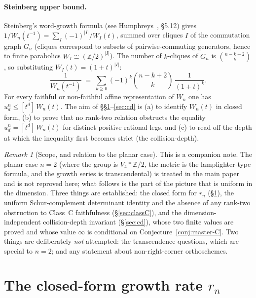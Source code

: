 \documentclass[11pt,a4paper]{article}
\theoremstyle{remark}
\newtheorem{remark}[theorem]{Remark}
\theoremstyle{plain}
\begin{document}
\paragraph{Steinberg upper bound.}  Steinberg's word-growth formula
(see Humphreys~\cite{humphreys90}, §5.12) gives
$1 / W_n(t^{-1}) = \sum_I (-1)^{|I|} / W_I(t)$, summed over cliques
$I$ of the commutation graph $G_n$ (cliques correspond to subsets
of pairwise-commuting generators, hence to finite parabolics
$W_I \cong (\mathbb{Z}/2)^{|I|}$).  The number of $k$-cliques of
$G_n$ is $\binom{n-k+2}{k}$, so substituting $W_I(t) = (1+t)^{|I|}$:
\begin{equation}\label{eq:steinberg-Wn}
\frac{1}{W_n(t^{-1})}  \;=\;  \sum_{k \ge 0} (-1)^k \binom{n - k + 2}{k}\,
\frac{1}{(1+t)^k}.
\end{equation}
For every faithful or non-faithful affine representation of $W_n$ one
has $u_d^n \le [t^d]\, W_n(t)$.  The aim of \S\S\ref{sec:rate}--\ref{sec:cd}
is (a) to identify $W_n(t)$ in closed form, (b) to prove that no rank-two
relation obstructs the equality $u_d^n = [t^d]\, W_n(t)$ for distinct positive
rational legs, and (c) to read off the depth at which the inequality first
becomes strict (the collision-depth).

\begin{remark}[Scope, and relation to the planar case]\label{rem:scope}
This is a companion note. The planar case $n=2$ (where the group is
$V_4 * \mathbb{Z}/2$, the metric is the lamplighter-type formula, and the growth series is
transcendental) is treated in the main paper and is not reproved here; what follows is the
part of the picture that is uniform in the dimension. Three things are established: the closed
form for $r_n$ (\S\ref{sec:rate}), the uniform Schur-complement determinant identity and the
absence of any rank-two obstruction to Class~C faithfulness (\S\ref{sec:classC}), and the
dimension-independent collision-depth invariant (\S\ref{sec:cd}), whose two finite values are
proved and whose value $\infty$ is conditional on Conjecture~\ref{conj:master-C}.
Two things are deliberately \emph{not} attempted: the transcendence questions, which are special to
$n=2$; and any statement about non-right-corner orthoschemes.
\end{remark}

\section{The closed-form growth rate $r_n$}\label{sec:rate}
\end{document}
